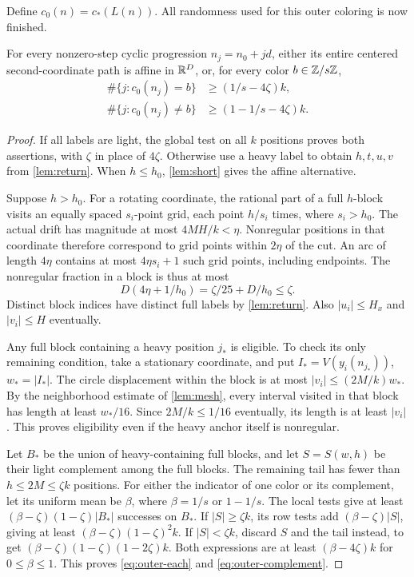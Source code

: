Define \(c_0(n)=c_*(L(n))\).
All randomness used for this outer coloring is now finished.

\begin{theorem}\label{thm:dichotomy}
For every nonzero-step cyclic progression \(n_j=n_0+jd\), either
its entire centered second-coordinate path is affine in \(\mathbb R^D\),
or, for every color \(b\in\mathbb Z/s\mathbb Z\),
\begin{align}
 \#\{j:c_0(n_j)=b\}&\ge(1/s-4\zeta)k,\label{eq:outer-each}\\
 \#\{j:c_0(n_j)\ne b\}&\ge(1-1/s-4\zeta)k.\label{eq:outer-complement}
\end{align}
\end{theorem}

\begin{proof}
If all labels are light, the global test on all \(k\) positions proves
both assertions, with \(\zeta\) in place of \(4\zeta\).
Otherwise use a heavy label to obtain \(h,t,u,v\) from
\cref{lem:return}. When \(h\le h_0\), \cref{lem:short} gives the
affine alternative.

Suppose \(h>h_0\). For a rotating coordinate, the rational part of a
full \(h\)-block visits an equally spaced \(s_i\)-point grid, each point
\(h/s_i\) times, where \(s_i>h_0\).
The actual drift has magnitude at most \(4MH/k<\eta\).
Nonregular positions in that coordinate therefore correspond to grid
points within \(2\eta\) of the cut.
An arc of length \(4\eta\) contains at most \(4\eta s_i+1\) such
grid points, including endpoints.
The nonregular fraction in a block is thus at most
\[
 D(4\eta+1/h_0)
 =\zeta/25+D/h_0\le\zeta.
\]
Distinct block indices have distinct full labels by
\cref{lem:return}. Also \(|u_i|\le H_x\) and \(|v_i|\le H\)
eventually.

Any full block containing a heavy position \(j_*\) is eligible.
To check its only remaining condition, take a stationary coordinate,
and put \(I_*=V(y_i(n_{j_*}))\), \(w_*=|I_*|\).
The circle displacement within the block is at most
\(|v_i|\le(2M/k)w_*\).
By the neighborhood estimate of \cref{lem:mesh}, every interval
visited in that block has length at least \(w_*/16\).
Since \(2M/k\le1/16\) eventually, its length is at least \(|v_i|\).
This proves eligibility even if the heavy anchor itself is nonregular.

Let \(B_*\) be the union of heavy-containing full blocks, and let
\(S=S(w,h)\) be their light complement among the full blocks.
The remaining tail has fewer than \(h\le2M\le\zeta k\) positions.
For either the indicator of one color or its complement, let its
uniform mean be \(\beta\), where \(\beta=1/s\) or \(1-1/s\).
The local tests give at least
\((\beta-\zeta)(1-\zeta)|B_*|\) successes on \(B_*\).
If \(|S|\ge\zeta k\), its row tests add
\((\beta-\zeta)|S|\), giving at least
\((\beta-\zeta)(1-\zeta)^2k\).
If \(|S|<\zeta k\), discard \(S\) and the tail instead, to get
\((\beta-\zeta)(1-\zeta)(1-2\zeta)k\).
Both expressions are at least \((\beta-4\zeta)k\) for \(0\le\beta\le1\).
This proves \eqref{eq:outer-each} and \eqref{eq:outer-complement}.
\end{proof}

